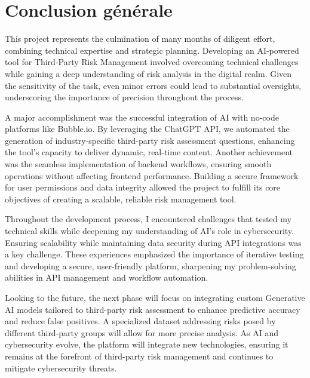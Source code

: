 \chapter*{Conclusion générale}
\adjustmtc
\thispagestyle{MyStyle}

This project represents the culmination of many months of diligent effort, combining technical expertise and strategic planning. Developing an AI-powered tool for Third-Party Risk Management involved overcoming technical challenges while gaining a deep understanding of risk analysis in the digital realm. Given the sensitivity of the task, even minor errors could lead to substantial oversights, underscoring the importance of precision throughout the process.\par

A major accomplishment was the successful integration of AI with no-code platforms like Bubble.io. By leveraging the ChatGPT API, we automated the generation of industry-specific third-party risk assessment questions, enhancing the tool's capacity to deliver dynamic, real-time content. Another achievement was the seamless implementation of backend workflows, ensuring smooth operations without affecting frontend performance. Building a secure framework for user permissions and data integrity allowed the project to fulfill its core objectives of creating a scalable, reliable risk management tool.\par

Throughout the development process, I encountered challenges that tested my technical skills while deepening my understanding of AI’s role in cybersecurity. Ensuring scalability while maintaining data security during API integrations was a key challenge. These experiences emphasized the importance of iterative testing and developing a secure, user-friendly platform, sharpening my problem-solving abilities in API management and workflow automation.\par

Looking to the future, the next phase will focus on integrating custom Generative AI models tailored to third-party risk assessment to enhance predictive accuracy and reduce false positives. A specialized dataset addressing risks posed by different third-party groups will allow for more precise analysis. As AI and cybersecurity evolve, the platform will integrate new technologies, ensuring it remains at the forefront of third-party risk management and continues to mitigate cybersecurity threats.\par